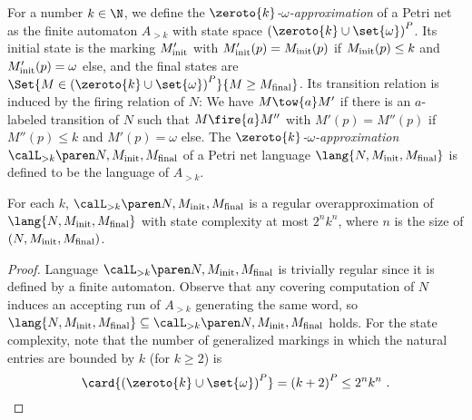 \documentclass[../../diss.tex]{subfiles}
\begin{document}
For a number $k \in \N$, we define the \emph{$\zeroto{k}$-$\omega$-approximation} of a Petri net  as the finite automaton $A_{> k}$ with state space ${(\zeroto{k} \cup \set{\omega} )}^P$.
Its initial state is the marking $M_{\text{init}}'$ with $M_{\text{init}}' (p) = M_{\text{init}}(p)$ if $M_{\text{init}}(p) \leq k$ and $M_{\text{init}}'(p) = \omega$ else, and the final states are $\Set{ M \in {(\zeroto{k} \cup \set{\omega} )}^P  }{M \geq \Mfinal}$.
Its transition relation is induced by the firing relation of $N$:
We have $M \tow{a} M'$ if there is an $a$-labeled transition of $N$ such that $M \fire{a} M''$ with $M'(p) = M''(p)$ if $M''(p) \leq k$ and $M'(p) = \omega$ else.
The \emph{$\zeroto{k}$-$\omega$-approximation} $\langoak{k}{N,\Minit,\Mfinal}$ of a Petri net language $\lang{N,\Minit,\Mfinal}$ is defined to be the language of $A_{>k}$.

\begin{lemma}%
\label{Lemma:PNOverapproximation}%
    For each $k$, $\langoak{k}{N,\Minit,\Mfinal}$ is a regular overapproximation of $\lang{N,\Minit,\Mfinal}$ with state complexity at most $2^n k^n$, where $n$ is the size of $(N,M_{\text{init}},M_{\text{final}})$.
\end{lemma}

\begin{proof}
    Language $\langoak{k}{N,\Minit,\Mfinal}$ is trivially regular since it is defined by a finite automaton.
    Observe that any covering computation of $N$ induces an accepting run of $A_{> k}$ generating the same word, so $\lang{N,\Minit,\Mfinal} \subseteq \langoak{k}{N,\Minit,\Mfinal}$ holds.
    For the state complexity, note that the number of generalized markings in which the natural entries are bounded by $k$ (for $k \geq 2$) is
    \[
        \card{ {(\zeroto{k} \cup \set{\omega} )}^P }
        = {(k+2)}^P
        \leq 2^n k^n
        \ .
    \]
\end{proof}
\end{document}
